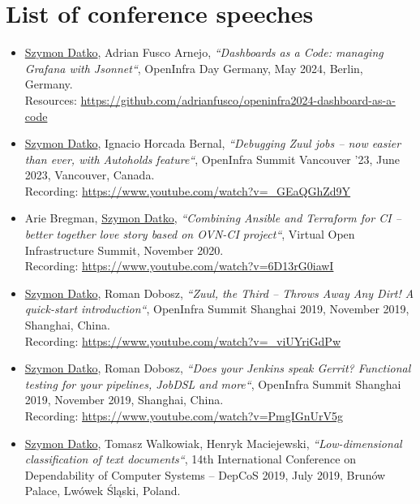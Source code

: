 \section{List of conference speeches}

\begin{itemize}
    \item
        \underline{Szymon Datko}, Adrian Fusco Arnejo,
        \textit{“Dashboards as a Code: managing Grafana with Jsonnet“},
        OpenInfra Day Germany,
        May 2024, Berlin, Germany.\\
        Resources: {\footnotesize\url{https://github.com/adrianfusco/openinfra2024-dashboard-as-a-code}}

    \item
        \underline{Szymon Datko}, Ignacio Horcada Bernal,
        \textit{“Debugging Zuul jobs – now easier than ever, with Autoholds feature“},
        OpenInfra Summit Vancouver '23,
        June 2023, Vancouver, Canada.\\
        Recording: \url{https://www.youtube.com/watch?v=_GEaQGhZd9Y}

    \item
        Arie Bregman, \underline{Szymon Datko},
        \textit{“Combining Ansible and Terraform for CI – better together love story based on OVN-CI project“},
        Virtual Open Infrastructure Summit,
        November 2020.\\
        Recording: \url{https://www.youtube.com/watch?v=6D13rG0iawI}

    \item
        \underline{Szymon Datko}, Roman Dobosz,
        \textit{“Zuul, the Third – Throws Away Any Dirt! A quick-start introduction“},
        OpenInfra Summit Shanghai 2019,
        November 2019, Shanghai, China.\\
        Recording: \url{https://www.youtube.com/watch?v=_viUYriGdPw}

    \item
        \underline{Szymon Datko}, Roman Dobosz,
        \textit{“Does your Jenkins speak Gerrit? Functional testing for your pipelines, JobDSL and more“},
        OpenInfra Summit Shanghai 2019,
        November 2019, Shanghai, China.\\
        Recording: \url{https://www.youtube.com/watch?v=PmgIGnUrV5g}

    \item
        \underline{Szymon Datko}, Tomasz Walkowiak, Henryk Maciejewski,
        \textit{“Low-dimensional classification of text documents“},
        14th International Conference on Dependability of Computer Systems – DepCoS 2019,
        July 2019, Brunów Palace, Lwówek Śląski, Poland.


\end{itemize}

